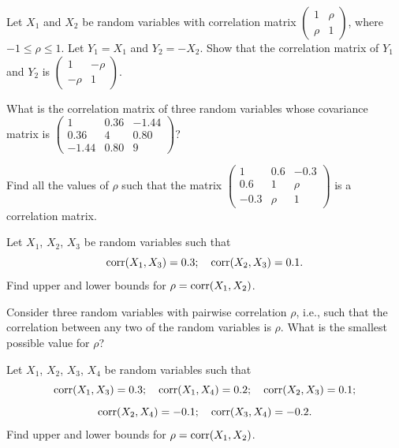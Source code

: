 \begin{exercises}

\item Let $X_1$ and $X_2$ be random variables with correlation matrix
$\begin{pmatrix} 1 & \rho \\ \rho & 1 \end{pmatrix}$, where $-1 \le \rho \le 1$. Let
$Y_1 = X_1$ and $Y_2 = -X_2$. Show that the correlation matrix of $Y_1$ and $Y_2$ is
$\begin{pmatrix} 1 & -\rho \\ -\rho & 1 \end{pmatrix}$.

\item What is the correlation matrix of three random variables whose covariance matrix
is $\begin{pmatrix} 1 & 0.36 & -1.44 \\ 0.36 & 4 & 0.80 \\ -1.44 & 0.80 & 9
\end{pmatrix}$?

\item Find all the values of $\rho$ such that the matrix
$\begin{pmatrix} 1 & 0.6 & -0.3 \\ 0.6 & 1 & \rho \\ -0.3 & \rho & 1 \end{pmatrix}$ is a
correlation matrix.

\item Let $X_1$, $X_2$, $X_3$ be random variables such that
\[
\operatorname{corr}(X_1,X_3) = 0.3; \quad \operatorname{corr}(X_2,X_3) = 0.1.
\]
Find upper and lower bounds for $\rho = \operatorname{corr}(X_1,X_2)$.

\item Consider three random variables with pairwise correlation $\rho$, i.e., such that
the correlation between any two of the random variables is $\rho$. What is the smallest
possible value for $\rho$?

\item Let $X_1$, $X_2$, $X_3$, $X_4$ be random variables such that
\[
\operatorname{corr}(X_1,X_3) = 0.3; \quad \operatorname{corr}(X_1,X_4) = 0.2; \quad \operatorname{corr}(X_2,X_3) = 0.1;
\]
\[
\operatorname{corr}(X_2,X_4) = -0.1; \quad \operatorname{corr}(X_3,X_4) = -0.2.
\]
Find upper and lower bounds for $\rho = \operatorname{corr}(X_1,X_2)$.


\end{exercises}
